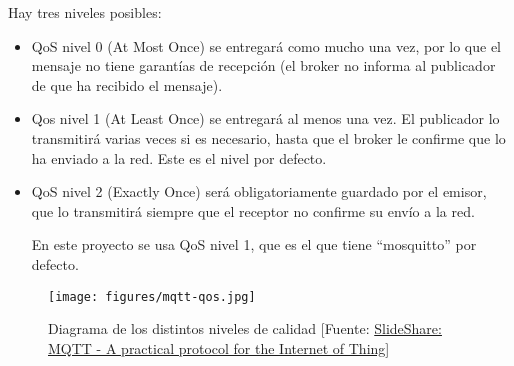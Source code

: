 Hay tres niveles posibles:
\begin{itemize}
\item QoS nivel 0 (At Most Once) se entregará como mucho una vez, por lo que el mensaje no tiene garantías de recepción (el broker no informa al publicador de que ha recibido el mensaje).

\item Qos nivel 1 (At Least Once) se entregará al menos una vez. El publicador lo transmitirá varias veces si es necesario, hasta que el broker le confirme que lo ha enviado a la red. Este es el nivel por defecto.

\item QoS nivel 2 (Exactly Once) será obligatoriamente guardado por el emisor, que lo transmitirá siempre que el receptor no confirme su envío a la red.

En este proyecto se usa QoS nivel 1, que es el que tiene ``mosquitto'' por defecto.

\end{itemize}
\begin{figure}[htb]
	\begin{center}
		\texttt{[image: figures/mqtt-qos.jpg]}
		\caption{Diagrama de los distintos niveles de calidad [Fuente: \href{https://image.slidesharecdn.com/0xwitjksqnqruoz4tnsi-signature-6a256d24caf5d1fcc6a3bf1d013dfe0e1fa99369a560d140998f50cbdbc6d127-poli-140828123252-phpapp02/95/mqtt-a-practical-protocol-for-the-internet-of-things-15-638.jpg?cb=1409229409}{SlideShare: MQTT - A practical protocol for the Internet of Thing}] \label{qos}}
	\end{center}
\end{figure}

